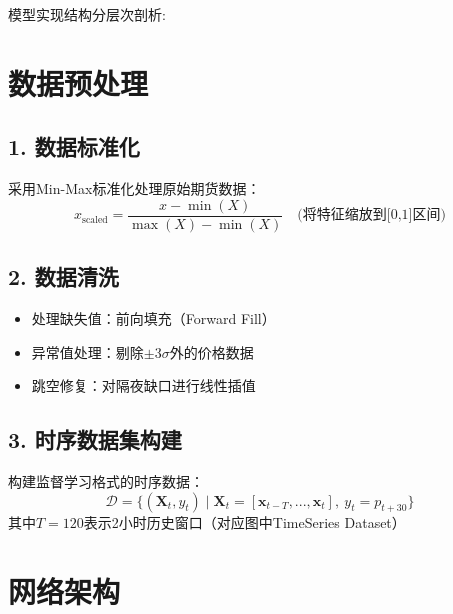 \documentclass[a4paper,12pt]{ctexart}
\begin{document}
模型实现结构分层次剖析:

\section*{数据预处理}
\subsection*{1. 数据标准化}
采用Min-Max标准化处理原始期货数据：
\begin{equation}
x_{\text{scaled}} = \frac{x - \min(X)}{\max(X) - \min(X)} \quad \text{(将特征缩放到[0,1]区间)}
\end{equation}

\subsection*{2. 数据清洗}
\begin{itemize}
\item 处理缺失值：前向填充（Forward Fill）
\item 异常值处理：剔除$\pm 3\sigma$外的价格数据
\item 跳空修复：对隔夜缺口进行线性插值
\end{itemize}

\subsection*{3. 时序数据集构建}
构建监督学习格式的时序数据：
\begin{equation}
\mathcal{D} = \{ (\mathbf{X}_t, y_t) \mid \mathbf{X}_t = [\mathbf{x}_{t-T}, ..., \mathbf{x}_t], \ y_t = p_{t+30} \}
\end{equation}
其中$T=120$表示2小时历史窗口（对应图中TimeSeries Dataset）


\section*{网络架构}
\end{document}
